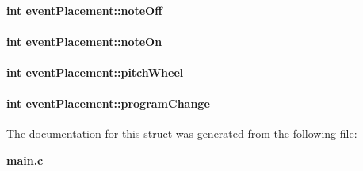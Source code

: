 \paragraph[{note\+Off}]{\setlength{\rightskip}{0pt plus 5cm}int event\+Placement\+::note\+Off}\label{structevent_placement_a3466f6aaaf7efc6fd7fc31f4fe41c11a}
\paragraph[{note\+On}]{\setlength{\rightskip}{0pt plus 5cm}int event\+Placement\+::note\+On}\label{structevent_placement_afda36632eb365d3abc4a44d17fd42f89}
\paragraph[{pitch\+Wheel}]{\setlength{\rightskip}{0pt plus 5cm}int event\+Placement\+::pitch\+Wheel}\label{structevent_placement_a518dafda61912ec33cc1db88e3e559fa}
\paragraph[{program\+Change}]{\setlength{\rightskip}{0pt plus 5cm}int event\+Placement\+::program\+Change}\label{structevent_placement_a047734cc2a3854a154c3717479cf88b0}


The documentation for this struct was generated from the following file\+:\begin{DoxyCompactItemize}
\item 
{\bf main.\+c}\end{DoxyCompactItemize}

